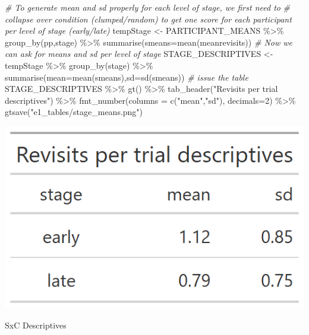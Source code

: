\documentclass[
]{book}
\newenvironment{Shaded}{\begin{snugshade}}{\end{snugshade}}
\newcommand{\AttributeTok}[1]{\textcolor[rgb]{0.77,0.63,0.00}{#1}}
\newcommand{\CommentTok}[1]{\textcolor[rgb]{0.56,0.35,0.01}{\textit{#1}}}
\newcommand{\DecValTok}[1]{\textcolor[rgb]{0.00,0.00,0.81}{#1}}
\newcommand{\FunctionTok}[1]{\textcolor[rgb]{0.00,0.00,0.00}{#1}}
\newcommand{\NormalTok}[1]{#1}
\newcommand{\OtherTok}[1]{\textcolor[rgb]{0.56,0.35,0.01}{#1}}
\newcommand{\SpecialCharTok}[1]{\textcolor[rgb]{0.00,0.00,0.00}{#1}}
\newcommand{\StringTok}[1]{\textcolor[rgb]{0.31,0.60,0.02}{#1}}
\begin{document}
\begin{Shaded}
\begin{Highlighting}[]
\CommentTok{\# To generate mean and sd properly for each level of stage, we first need to }
\CommentTok{\# collapse over condition (clumped/random) to get one score for each participant per level of stage (early/late)}
\NormalTok{tempStage }\OtherTok{\textless{}{-}}\NormalTok{ PARTICIPANT\_MEANS }\SpecialCharTok{\%\textgreater{}\%} \FunctionTok{group\_by}\NormalTok{(pp,stage) }\SpecialCharTok{\%\textgreater{}\%} \FunctionTok{summarise}\NormalTok{(}\AttributeTok{smeans=}\FunctionTok{mean}\NormalTok{(meanrevisits))}
\CommentTok{\# Now we can ask for means and sd per level of stage}
\NormalTok{STAGE\_DESCRIPTIVES }\OtherTok{\textless{}{-}}\NormalTok{ tempStage  }\SpecialCharTok{\%\textgreater{}\%} \FunctionTok{group\_by}\NormalTok{(stage) }\SpecialCharTok{\%\textgreater{}\%} \FunctionTok{summarise}\NormalTok{(}\AttributeTok{mean=}\FunctionTok{mean}\NormalTok{(smeans),}\AttributeTok{sd=}\FunctionTok{sd}\NormalTok{(smeans))}
\CommentTok{\# issue the table}
\NormalTok{STAGE\_DESCRIPTIVES }\SpecialCharTok{\%\textgreater{}\%} 
  \FunctionTok{gt}\NormalTok{() }\SpecialCharTok{\%\textgreater{}\%} 
  \FunctionTok{tab\_header}\NormalTok{(}\StringTok{"Revisits per trial descriptives"}\NormalTok{) }\SpecialCharTok{\%\textgreater{}\%} 
  \FunctionTok{fmt\_number}\NormalTok{(}\AttributeTok{columns =} \FunctionTok{c}\NormalTok{(}\StringTok{"mean"}\NormalTok{,}\StringTok{"sd"}\NormalTok{), }\AttributeTok{decimals=}\DecValTok{2}\NormalTok{) }\SpecialCharTok{\%\textgreater{}\%} 
  \FunctionTok{gtsave}\NormalTok{(}\StringTok{"e1\_tables/stage\_means.png"}\NormalTok{)}
\end{Highlighting}
\end{Shaded}

\includegraphics[width=0.33\linewidth]{e1_figures/STAGE_DESCRIPTIVES-1}

SxC Descriptives
\end{document}
